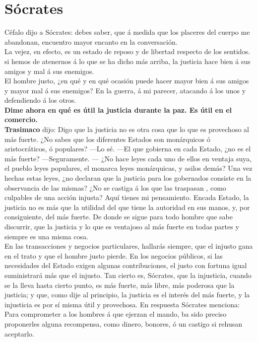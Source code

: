 \documentclass[10pt]{book}
\begin{document}
\section*{Sócrates}
Céfalo dijo a Sócrates:  debes saber, que á medida que los placeres del cuerpo me abandonan, encuentro mayor encanto en la conversación.\\
La vejez, en efecto, es un estado de reposo y de libertad respecto de los sentidos. \\
si hemos de atenernos á lo que se ha dicho más arriba, la justicia hace bien á sus amigos y mal á sus enemigos. \\
El hombre justo, ¿en qué y en qué ocasión puede hacer mayor bien á sus amigos y mayor mal á sus enemigos? En la guerra, á mi parecer, atacando á los unos y defendiendo á los otros. \\
\textbf{Dime ahora en qué es útil la justicia durante la paz. Es útil en el comercio.}\\
\textbf{Trasimaco} dijo: Digo que la justicia no es otra cosa que lo que es provechoso al más fuerte. ¿No sabes que los diferentes Estados son monárquicos ó aristocráticos, ó populares? —Lo sé. —El que gobierna en cada Estado, ¿no es el más fuerte? —Seguramente. — ¿No hace leyes cada uno de ellos en ventaja suya, el pueblo leyes populares, el monarca leyes monárquicas, y asilos demás? Una vez hechas estas leyes, ¿no declaran que la justicia para los gobernados consiste en la observancia de las mismas? ¿No se castiga á los que las traspasan , como culpables de una acción injusta? Aquí tienes mi pensamiento. Encada Estado, la justicia no es más que la utilidad del que tiene la autoridad en sus manos, y, por consiguiente, del más fuerte. De donde se sigue para todo hombre que sabe discurrir, que la justicia y lo que es ventajoso al más fuerte en todas partes y siempre es una misma cosa.\\
En las transacciones y negocios particulares, hallarás siempre, que el injusto gana en el trato y que el hombre justo pierde. En los negocios públicos, si las necesidades del Estado exigen algunas contribuciones, el justo con fortuna igual suministrará más que el injusto. Tan cierto es, Sócrates, que la injusticia, cuando se la lleva hasta cierto punto, es más fuerte, más libre, más poderosa que la justicia; y que, como dije al principio, la justicia es el interés del más fuerte, y la injusticia es por sí misma útil y provechosa. 
En respuesta Sócrates menciona: Para comprometer a los hombres á que ejerzan el mando, ba sido preciso proponerles alguna recompensa, como dinero, bonores, ó un castigo si rehusan aceptarlo. \\
\end{document}
